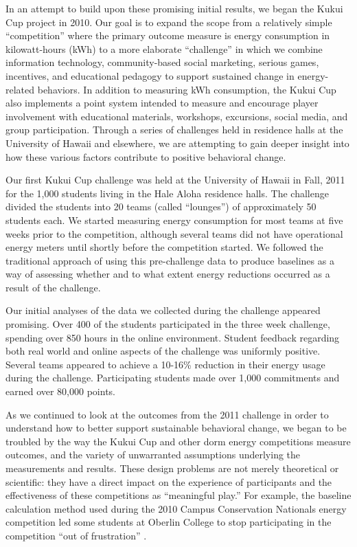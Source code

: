 \documentclass[jou]{apa} %
\begin{document}
In an attempt to build upon these promising initial results, we began the Kukui Cup
project in 2010.  Our goal is to expand the scope from a relatively simple ``competition''
where the primary outcome measure is energy consumption in kilowatt-hours (kWh) to a more
elaborate ``challenge'' in which we combine information technology, community-based social
marketing, serious games, incentives, and educational pedagogy to support sustained change
in energy-related behaviors.  In addition to measuring kWh consumption, the Kukui Cup also
implements a point system intended to measure and encourage player involvement with
educational materials, workshops, excursions, social media, and group participation.
Through a series of challenges held in residence halls at the University of Hawaii and
elsewhere, we are attempting to gain deeper insight into how these various factors
contribute to positive behavioral change.

Our first Kukui Cup challenge was held at the University of Hawaii in Fall, 2011 for the
1,000 students living in the Hale Aloha residence halls. The challenge divided the
students into 20 teams (called ``lounges'') of approximately 50 students each.  We started
measuring energy consumption for most teams at five weeks prior to the competition,
although several teams did not have operational energy meters until shortly before the
competition started. We followed the traditional approach of using this pre-challenge data
to produce baselines as a way of assessing whether and to what extent energy reductions
occurred as a result of the challenge.

Our initial analyses of the data we collected during the challenge appeared promising.
Over 400 of the students participated in the three week challenge, spending over 850 hours
in the online environment.  Student feedback regarding both real world and online aspects
of the challenge was uniformly positive.  Several teams appeared to achieve a 10-16\%
reduction in their energy usage during the challenge.  Participating students made over
1,000 commitments and earned over 80,000 points.

As we continued to look at the outcomes from the 2011 challenge in order to understand how
to better support sustainable behavioral change, we began to be troubled by the way the
Kukui Cup and other dorm energy competitions measure outcomes, and the variety of
unwarranted assumptions underlying the measurements and results.  These design problems
are not merely theoretical or scientific: they have a direct impact on the experience of
participants and the effectiveness of these competitions as ``meaningful play.''  For
example, the baseline calculation method used during the 2010 Campus Conservation
Nationals energy competition led some students at Oberlin College to stop participating in
the competition ``out of frustration'' \cite{Willens2010}.
\end{document}
